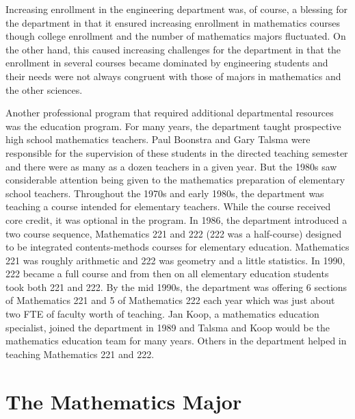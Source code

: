 \documentclass[
]{book}
\begin{document}
Increasing enrollment in the engineering department was, of course, a blessing for the department in that it ensured increasing enrollment in mathematics courses though college enrollment and the number of mathematics majors fluctuated. On the other hand, this caused increasing challenges for the department in that the enrollment in several courses became dominated by engineering students and their needs were not always congruent with those of majors in mathematics and the other sciences.

Another professional program that required additional departmental resources was the education program. For many years, the department taught prospective high school mathematics teachers. Paul Boonstra and Gary Talsma were responsible for the supervision of these students in the directed teaching semester and there were as many as a dozen teachers in a given year. But the 1980s saw considerable attention being given to the mathematics preparation of elementary school teachers. Throughout the 1970s and early 1980s, the department was teaching a course intended for elementary teachers. While the course received core credit, it was optional in the program. In 1986, the department introduced a two course sequence, Mathematics 221 and 222 (222 was a half-course) designed to be integrated contents-methods courses for elementary education. Mathematics 221 was roughly arithmetic and 222 was geometry and a little statistics. In 1990, 222 became a full course and from then on all elementary education students took both 221 and 222. By the mid 1990s, the department was offering 6 sections of Mathematics 221 and 5 of Mathematics 222 each year which was just about two FTE of faculty worth of teaching. Jan Koop, a mathematics education specialist, joined the department in 1989 and Talsma and Koop would be the mathematics education team for many years. Others in the department helped in teaching Mathematics 221 and 222.

\hypertarget{the-mathematics-major}{%
\section{The Mathematics Major}\label{the-mathematics-major}}
\end{document}
